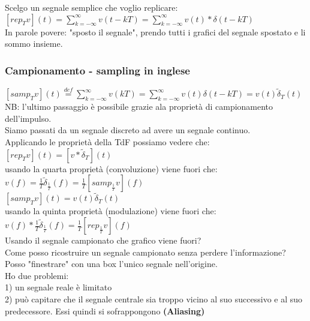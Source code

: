 	
	Scelgo un segnale semplice che voglio replicare:\\
	$ [rep_T v](t) = \sum_{k= -\infty}^{\infty} v(t-kT) = \sum_{k= -\infty}^{\infty} v(t)* \delta(t-kT)$\\
	In parole povere: "sposto il segnale", prendo tutti i grafici del segnale spostato e li sommo insieme.\\
	
	
	\subsubsection{Campionamento - sampling in inglese}
	
	
	$ [samp_T v](t) \overset{\mathit{def}}{=} \sum_{k= -\infty}^{\infty} v(kT) = \sum_{k= -\infty}^{\infty} v(t)\delta(t-kT)= v(t)\tilde{\delta}_T (t)$\\
	NB: l'ultimo passaggio è possibile grazie ala proprietà di campionamento dell'impulso.\\
	Siamo passati da un segnale discreto ad avere un segnale continuo.\\
	
	Applicando le proprietà della TdF possiamo vedere che:\\
	$ [rep_T v](t) = [v*\tilde{\delta}_T](t) $\\
	usando la quarta proprietà (convoluzione) viene fuori che:\\
	$ v(f) = \frac{1}{T} \tilde{\delta}_{\frac{1}{T}} (f) = \frac{1}{T} [samp_{\frac{1}{T}} v](f)$\\
	$ [samp_T v](t) =  v(t)  \tilde{\delta}_T (t)$\\
	usando la quinta proprietà (modulazione) viene fuori che:\\
	$ v(f) * \frac{1}{T} \tilde{\delta}_{\frac{1}{T}} (f) = \frac{1}{T} [rep_{\frac{1}{T}} v](f) $\\
	
	
	Usando il segnale campionato che grafico viene fuori?\\
	
	
	Come posso ricostruire un segnale campionato senza perdere l'informazione? Posso "finestrare" con una box l'unico segnale nell'origine.\\
	Ho due problemi:\\
	1) un segnale reale è limitato\\
	2) può capitare che il segnale centrale sia troppo vicino al suo successivo e al suo predecessore. Essi quindi si sofrappongono \textbf{(Aliasing)}\\
	
